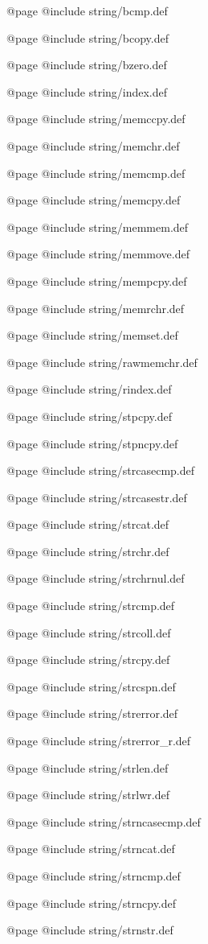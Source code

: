 @page
@include string/bcmp.def

@page
@include string/bcopy.def

@page
@include string/bzero.def

@page
@include string/index.def

@page
@include string/memccpy.def

@page
@include string/memchr.def

@page
@include string/memcmp.def

@page
@include string/memcpy.def

@page
@include string/memmem.def

@page
@include string/memmove.def

@page
@include string/mempcpy.def

@page
@include string/memrchr.def

@page
@include string/memset.def

@page
@include string/rawmemchr.def

@page
@include string/rindex.def

@page
@include string/stpcpy.def

@page
@include string/stpncpy.def

@page
@include string/strcasecmp.def

@page
@include string/strcasestr.def

@page
@include string/strcat.def

@page
@include string/strchr.def

@page
@include string/strchrnul.def

@page
@include string/strcmp.def

@page
@include string/strcoll.def

@page
@include string/strcpy.def

@page
@include string/strcspn.def

@page
@include string/strerror.def

@page
@include string/strerror_r.def

@page
@include string/strlen.def

@page
@include string/strlwr.def

@page
@include string/strncasecmp.def

@page
@include string/strncat.def

@page
@include string/strncmp.def

@page
@include string/strncpy.def

@page
@include string/strnstr.def

